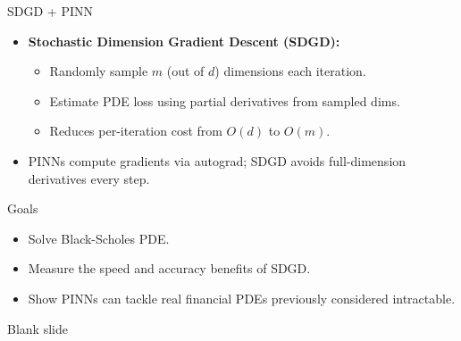 \documentclass{beamer}
\begin{document}
\begin{frame}{SDGD + PINN}
\begin{itemize}
    \item \textbf{Stochastic Dimension Gradient Descent (SDGD):}
    \begin{itemize}
        \item Randomly sample $m$ (out of $d$) dimensions each iteration.
        \item Estimate PDE loss using partial derivatives from sampled dims.
        \item Reduces per-iteration cost from $O(d)$ to $O(m)$.
    \end{itemize}
    \item PINNs compute gradients via autograd; SDGD avoids full-dimension derivatives every step.
\end{itemize}
\end{frame}

\begin{frame}{Goals}
\begin{itemize}
    \item Solve Black-Scholes PDE.
    \item Measure the speed and accuracy benefits of SDGD.
    \item Show PINNs can tackle real financial PDEs previously considered intractable.
\end{itemize}
\end{frame}

\begin{frame}{Blank slide}
\centering

\end{frame}
\end{document}
